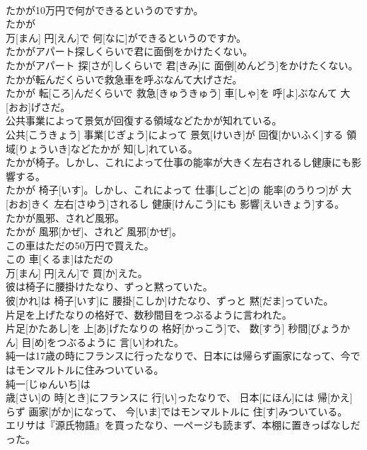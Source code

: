 \documentclass[8pt]{extreport}
\begin{document}
\begin{CJK}{UTF8}{min}
\\	たかが10万円で何ができるというのですか。	
\\	たかが 
\\	万[まん] 円[えん]で 何[なに]ができるというのですか。
\\	たかがアパート探しくらいで君に面倒をかけたくない。	
\\	たかがアパート 探[さが]しくらいで 君[きみ]に 面倒[めんどう]をかけたくない。
\\	たかが転んだくらいで救急車を呼ぶなんて大げさだ。	
\\	たかが 転[ころ]んだくらいで 救急[きゅうきゅう] 車[しゃ]を 呼[よ]ぶなんて 大[おお]げさだ。
\\	公共事業によって景気が回復する領域などたかが知れている。	
\\	公共[こうきょう] 事業[じぎょう]によって 景気[けいき]が 回復[かいふく]する 領域[りょういき]などたかが 知[し]れている。
\\	たかが椅子。しかし、これによって仕事の能率が大きく左右されるし健康にも影響する。	
\\	たかが 椅子[いす]。しかし、これによって 仕事[しごと]の 能率[のうりつ]が 大[おお]きく 左右[さゆう]されるし 健康[けんこう]にも 影響[えいきょう]する。
\\	たかが風邪、されど風邪。	
\\	たかが 風邪[かぜ]、されど 風邪[かぜ]。
\\	この車はただの50万円で買えた。	
\\	この 車[くるま]はただの 
\\	万[まん] 円[えん]で 買[か]えた。
\\	彼は椅子に腰掛けたなり、ずっと黙っていた。	
\\	彼[かれ]は 椅子[いす]に 腰掛[こしか]けたなり、ずっと 黙[だま]っていた。
\\	片足を上げたなりの格好で、数秒間目をつぶるように言われた。	
\\	片足[かたあし]を 上[あ]げたなりの 格好[かっこう]で、 数[すう] 秒間[びょうかん] 目[め]をつぶるように 言[い]われた。
\\	純一は17歳の時にフランスに行ったなりで、日本には帰らず画家になって、今ではモンマルトルに住みついている。	
\\	純一[じゅんいち]は 
\\	歳[さい]の 時[とき]にフランスに 行[い]ったなりで、 日本[にほん]には 帰[かえ]らず 画家[がか]になって、 今[いま]ではモンマルトルに 住[す]みついている。
\\	エリサは『源氏物語』を買ったなり、一ページも読まず、本棚に置きっぱなしだった。	

\end{CJK}
\end{document}
